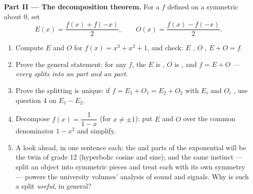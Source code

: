 \begin{problem}
\medskip
\noindent\textbf{Part II --- The decomposition theorem.}
For a  $f$ defined on a  symmetric about $0$, set
\[
E(x) = \frac{f(x) + f(-x)}{2},
\qquad
O(x) = \frac{f(x) - f(-x)}{2} .
\]
\begin{enumerate}[resume]
  \item Compute $E$ and $O$ for $f(x) = x^3 + x^2 + 1$, and
        check: $E$ , $O$ , $E + O = f$.
  \item Prove the general statement: for any $f$, the 
        $E$ is , $O$ is , and $f = E + O$ --- \emph{every
         splits into an  part and an  part}.
  \item Prove the splitting is unique: if
        $f = E_1 + O_1 = E_2 + O_2$ with $E_i$  and $O_i$
        , use question 4 on $E_1 - E_2$.
  \item Decompose $f(x) = \dfrac{1}{1 - x}$ (for
        $x \neq \pm 1$): put $E$ and $O$ over the common
        denominator $1 - x^2$ and simplify.
  \item A look ahead, in one sentence each: the  and 
        parts of the exponential  will be the twin
         of grade 12 (hyperbolic cosine and sine); and
        the same instinct --- split an object into symmetric
        pieces and treat each with its own symmetry --- powers
        the university volumes' analysis of sound and signals.
        Why is such a split \emph{useful}, in general?
\end{enumerate}


\end{problem}
